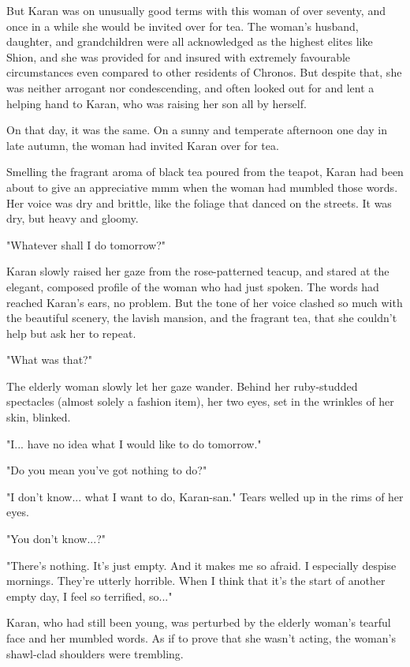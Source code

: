 But Karan was on unusually good terms with this woman of over seventy,
and once in a while she would be invited over for tea. The woman's
husband, daughter, and grandchildren were all acknowledged as the
highest elites like Shion, and she was provided for and insured with
extremely favourable circumstances even compared to other residents of
Chronos. But despite that, she was neither arrogant nor condescending,
and often looked out for and lent a helping hand to Karan, who was
raising her son all by herself.

On that day, it was the same. On a sunny and temperate afternoon one day
in late autumn, the woman had invited Karan over for tea.

Smelling the fragrant aroma of black tea poured from the teapot, Karan
had been about to give an appreciative mmm when the woman had mumbled
those words. Her voice was dry and brittle, like the foliage that danced
on the streets. It was dry, but heavy and gloomy.

"Whatever shall I do tomorrow?"

Karan slowly raised her gaze from the rose-patterned teacup, and stared
at the elegant, composed profile of the woman who had just spoken. The
words had reached Karan's ears, no problem. But the tone of her voice
clashed so much with the beautiful scenery, the lavish mansion, and the
fragrant tea, that she couldn't help but ask her to repeat.

"What was that?"

The elderly woman slowly let her gaze wander. Behind her ruby-studded
spectacles (almost solely a fashion item), her two eyes, set in the
wrinkles of her skin, blinked.

"I... have no idea what I would like to do tomorrow."

"Do you mean you've got nothing to do?"

"I don't know... what I want to do, Karan-san." Tears welled up in the
rims of her eyes.

"You don't know...?"

"There's nothing. It's just empty. And it makes me so afraid. I
especially despise mornings. They're utterly horrible. When I think that
it's the start of another empty day, I feel so terrified, so..."

Karan, who had still been young, was perturbed by the elderly woman's
tearful face and her mumbled words. As if to prove that she wasn't
acting, the woman's shawl-clad shoulders were trembling.

